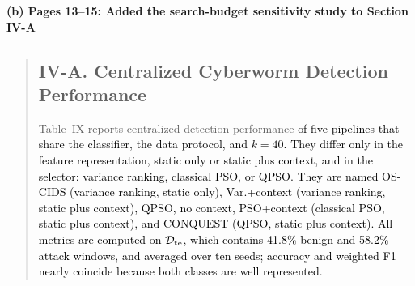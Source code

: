 \documentclass[11pt]{article}
\newenvironment{excerpt}{\begin{quote}\sloppy}{\end{quote}}
\newcommand{\mshead}[2]{\subsection*{\textbf{#1. #2}}}
\newcommand{\loc}[1]{\par\medskip\noindent\textbf{#1}\par}
\begin{document}
\loc{(b) Pages 13--15: Added the search-budget sensitivity study to Section IV-A}
\begin{excerpt}
\mshead{IV-A}{Centralized Cyberworm Detection Performance}


Table~IX reports centralized detection
performance \textcolor{black}{of five pipelines that share the
classifier, the data protocol, and $k=40$. They differ only in the
feature representation, static only or static plus context, and in
the selector: variance ranking, classical PSO, or QPSO. They are named
OS-CIDS (variance ranking, static only), Var.+context (variance
ranking, static plus context), QPSO, no context, PSO+context
(classical PSO, static plus context), and CONQUEST (QPSO, static plus
context). All metrics
are computed on $\mathcal{D}_{\rm te}$, which contains 41.8\% benign
and 58.2\% attack windows, and averaged over ten seeds; accuracy and
weighted F1 nearly coincide because both classes are well
represented.}

\setcounter{table}{8}
\begin{table}[H]
\centering
\caption{\textcolor{black}{Centralized detection over ten seeds, with Wilcoxon p-values against CONQUEST. \textsuperscript{\textdagger}Conference result~{[9]}, not directly comparable.}}

\color{black}
\setlength{\tabcolsep}{3pt}
\end{table}


\end{excerpt}
\end{document}
